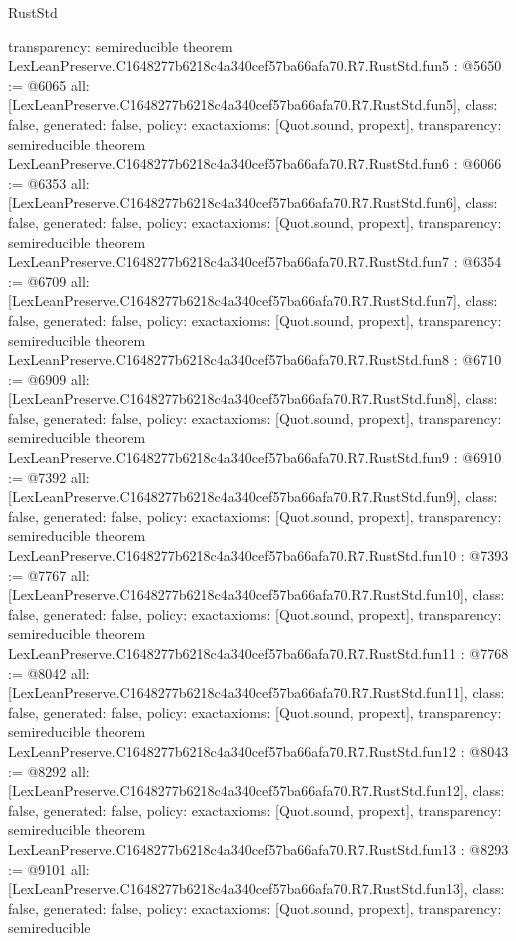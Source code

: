 \begin{lexlean}{RustStd}
\begin{coremodule}
{  transparency: semireducible
}
theorem LexLeanPreserve.C1648277b6218c4a340cef57ba66afa70.R7.RustStd.fun5 : @5650 := @6065 {
  all: [LexLeanPreserve.C1648277b6218c4a340cef57ba66afa70.R7.RustStd.fun5],
  class: false,
  generated: false,
  policy: exact{axioms: [Quot.sound, propext]},
  transparency: semireducible
}
theorem LexLeanPreserve.C1648277b6218c4a340cef57ba66afa70.R7.RustStd.fun6 : @6066 := @6353 {
  all: [LexLeanPreserve.C1648277b6218c4a340cef57ba66afa70.R7.RustStd.fun6],
  class: false,
  generated: false,
  policy: exact{axioms: [Quot.sound, propext]},
  transparency: semireducible
}
theorem LexLeanPreserve.C1648277b6218c4a340cef57ba66afa70.R7.RustStd.fun7 : @6354 := @6709 {
  all: [LexLeanPreserve.C1648277b6218c4a340cef57ba66afa70.R7.RustStd.fun7],
  class: false,
  generated: false,
  policy: exact{axioms: [Quot.sound, propext]},
  transparency: semireducible
}
theorem LexLeanPreserve.C1648277b6218c4a340cef57ba66afa70.R7.RustStd.fun8 : @6710 := @6909 {
  all: [LexLeanPreserve.C1648277b6218c4a340cef57ba66afa70.R7.RustStd.fun8],
  class: false,
  generated: false,
  policy: exact{axioms: [Quot.sound, propext]},
  transparency: semireducible
}
theorem LexLeanPreserve.C1648277b6218c4a340cef57ba66afa70.R7.RustStd.fun9 : @6910 := @7392 {
  all: [LexLeanPreserve.C1648277b6218c4a340cef57ba66afa70.R7.RustStd.fun9],
  class: false,
  generated: false,
  policy: exact{axioms: [Quot.sound, propext]},
  transparency: semireducible
}
theorem LexLeanPreserve.C1648277b6218c4a340cef57ba66afa70.R7.RustStd.fun10 : @7393 := @7767 {
  all: [LexLeanPreserve.C1648277b6218c4a340cef57ba66afa70.R7.RustStd.fun10],
  class: false,
  generated: false,
  policy: exact{axioms: [Quot.sound, propext]},
  transparency: semireducible
}
theorem LexLeanPreserve.C1648277b6218c4a340cef57ba66afa70.R7.RustStd.fun11 : @7768 := @8042 {
  all: [LexLeanPreserve.C1648277b6218c4a340cef57ba66afa70.R7.RustStd.fun11],
  class: false,
  generated: false,
  policy: exact{axioms: [Quot.sound, propext]},
  transparency: semireducible
}
theorem LexLeanPreserve.C1648277b6218c4a340cef57ba66afa70.R7.RustStd.fun12 : @8043 := @8292 {
  all: [LexLeanPreserve.C1648277b6218c4a340cef57ba66afa70.R7.RustStd.fun12],
  class: false,
  generated: false,
  policy: exact{axioms: [Quot.sound, propext]},
  transparency: semireducible
}
theorem LexLeanPreserve.C1648277b6218c4a340cef57ba66afa70.R7.RustStd.fun13 : @8293 := @9101 {
  all: [LexLeanPreserve.C1648277b6218c4a340cef57ba66afa70.R7.RustStd.fun13],
  class: false,
  generated: false,
  policy: exact{axioms: [Quot.sound, propext]},
  transparency: semireducible
}
\end{coremodule}
\end{lexlean}

